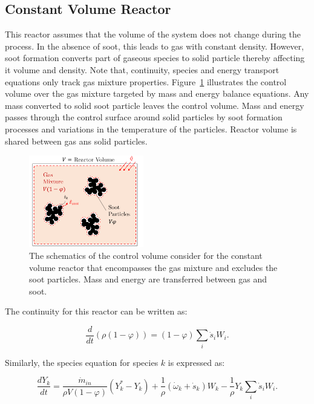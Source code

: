\subsection{Constant Volume Reactor}
This reactor assumes that the volume of the system does not change during the process. In the absence of soot, this leads to gas with constant density. However, soot formation converts part of gaseous species to solid particle thereby affecting it volume and density. Note that, continuity, species and energy transport equations only track gas mixture properties. Figure~\ref{fig:constuvcv} illustrates the control volume over the gas mixture targeted by mass and energy balance equations. Any mass converted to solid soot particle leaves the control volume. Mass and energy passes through the control surface around solid particles by soot formation processes and variations in the temperature of the particles. Reactor volume is shared between gas ans solid particles.
\begin{figure}[!htbp]
	\centering
	\includegraphics[height=40mm, ]{Figures/Theory/ConstUV.pdf}
	\caption{The schematics of the control volume consider for the constant volume reactor that encompasses the gas mixture and excludes the soot particles. Mass and energy are transferred between gas and soot.}
	\label{fig:constuvcv}
\end{figure}
 
The continuity for this reactor can be written as:

\begin{equation}
	\frac{d}{dt}(\rho(1-\varphi)) =(1-\varphi) \sum_i \dot s_i W_i
	\label{eqn:contconstuv}.
\end{equation} 

Similarly, the species equation for species $k$ is expressed as:

\begin{equation}
	\frac{dY_k}{dt}
	=
	\frac{{\dot{m}}_{in}}{\rho V\left(1-\varphi\right)}
	\left( Y_k^\ast-Y_k \right)
	+
	\frac{1}{\rho}
	\left(
		{\dot{\omega}}_k
		+
		{\dot{s}}_k
	\right)W_k
	-\frac{1}{\rho}Y_k\sum_{i}{{\dot{s}}_i W_i}
	\label{eqn:speciesconstuv}.
\end{equation}


